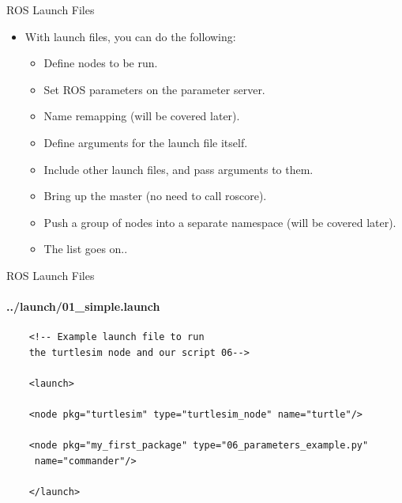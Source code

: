 \documentclass{beamer}
\begin{document}
\begin{frame}{ROS Launch Files}
    \begin{itemize}        
        \item With launch files, you can do the following:
        \begin{itemize}
            \item Define nodes to be run.
            
            \item Set ROS parameters on the parameter server.
            
            \item Name remapping (will be covered later).
            
            \item Define arguments for the launch file itself.
            
            \item Include other launch files, and pass arguments to them.
            
            \item Bring up the master (no need to call {\ttfamily \colorbox{gray!30!white}{roscore}}).
            
            \item Push a group of nodes into a separate namespace (will be covered later).
           
             \item The list goes on..          
           \end{itemize} 

        
    \end{itemize}  
\end{frame}


\begin{frame}[fragile]{ROS Launch Files}
    \framesubtitle{../launch/01\_simple.launch}
    \begin{lstlisting}
    <!-- Example launch file to run 
    the turtlesim node and our script 06-->
    
    <launch>
    
    <node pkg="turtlesim" type="turtlesim_node" name="turtle"/>
    
    <node pkg="my_first_package" type="06_parameters_example.py" 
     name="commander"/>
    
    </launch>
    \end{lstlisting}
\end{frame}
\end{document}
